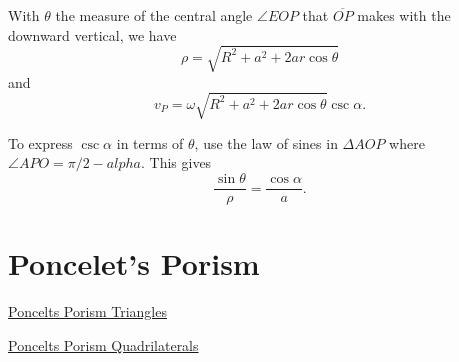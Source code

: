 \documentclass{ximera}
\begin{document}



With $\theta$ the measure of the central angle $\angle EOP$ that $\overline{OP}$ makes with the downward vertical, we have
\[
  \rho = \sqrt{R^2 + a^2 + 2ar \cos \theta}
\]
and 
\[
    v_P = \omega \sqrt{R^2 + a^2 + 2ar \cos \theta} \csc \alpha .
\]

To express $\csc\alpha$ in terms of $\theta$, use the law of sines in $\Delta AOP$ where $\angle APO = \pi/2 - alpha$. This gives
\[
    \frac{\sin\theta}{\rho} = \frac{\cos\alpha}{a}.
\]

\fi

\section*{Poncelet's Porism}


\begin{exploration}

\begin{onlineOnly}
    \begin{center}
\end{center}
\end{onlineOnly}

\href{https://www.desmos.com/calculator/0aihemcv0o}{Poncelts Porism Triangles}

\end{exploration}


\begin{exploration}

\begin{onlineOnly}
    \begin{center}
\end{center}
\end{onlineOnly}

\href{https://www.desmos.com/calculator/pua4ogjcmr}{Poncelts Porism Quadrilaterals}


\end{exploration}



\begin{onlineOnly}
    \begin{center}
\end{center}
\end{onlineOnly}
\end{document}
